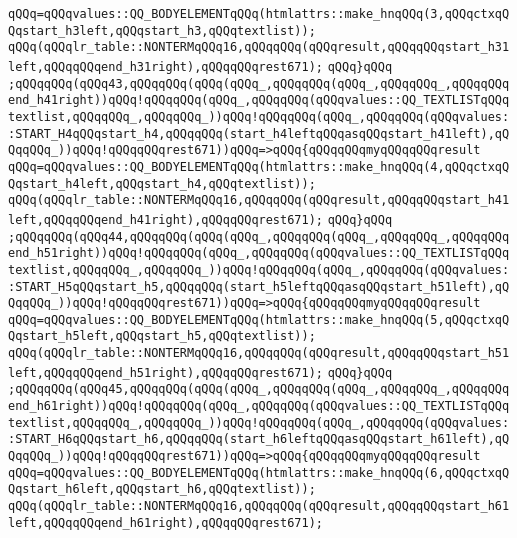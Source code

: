 \verb|qQQq=qQQqvalues::QQ_BODYELEMENTqQQq(htmlattrs::make_hnqQQq(3,qQQqctxqQQqstart_h3left,qQQqstart_h3,qQQqtextlist));|\newline
\verb|qQQq(qQQqlr_table::NONTERMqQQq16,qQQqqQQq(qQQqresult,qQQqqQQqstart_h31left,qQQqqQQqend_h31right),qQQqqQQqrest671);|\newline
\verb|qQQq}qQQq|\newline
\verb|;qQQqqQQq(qQQq43,qQQqqQQq(qQQq(qQQq_,qQQqqQQq(qQQq_,qQQqqQQq_,qQQqqQQqend_h41right))qQQq!qQQqqQQq(qQQq_,qQQqqQQq(qQQqvalues::QQ_TEXTLISTqQQqtextlist,qQQqqQQq_,qQQqqQQq_))qQQq!qQQqqQQq(qQQq_,qQQqqQQq(qQQqvalues::START_H4qQQqstart_h4,qQQqqQQq(start_h4leftqQQqasqQQqstart_h41left),qQQqqQQq_))qQQq!qQQqqQQqrest671))qQQq=>qQQq{qQQqqQQqmyqQQqqQQqresult|\newline
\verb|qQQq=qQQqvalues::QQ_BODYELEMENTqQQq(htmlattrs::make_hnqQQq(4,qQQqctxqQQqstart_h4left,qQQqstart_h4,qQQqtextlist));|\newline
\verb|qQQq(qQQqlr_table::NONTERMqQQq16,qQQqqQQq(qQQqresult,qQQqqQQqstart_h41left,qQQqqQQqend_h41right),qQQqqQQqrest671);|\newline
\verb|qQQq}qQQq|\newline
\verb|;qQQqqQQq(qQQq44,qQQqqQQq(qQQq(qQQq_,qQQqqQQq(qQQq_,qQQqqQQq_,qQQqqQQqend_h51right))qQQq!qQQqqQQq(qQQq_,qQQqqQQq(qQQqvalues::QQ_TEXTLISTqQQqtextlist,qQQqqQQq_,qQQqqQQq_))qQQq!qQQqqQQq(qQQq_,qQQqqQQq(qQQqvalues::START_H5qQQqstart_h5,qQQqqQQq(start_h5leftqQQqasqQQqstart_h51left),qQQqqQQq_))qQQq!qQQqqQQqrest671))qQQq=>qQQq{qQQqqQQqmyqQQqqQQqresult|\newline
\verb|qQQq=qQQqvalues::QQ_BODYELEMENTqQQq(htmlattrs::make_hnqQQq(5,qQQqctxqQQqstart_h5left,qQQqstart_h5,qQQqtextlist));|\newline
\verb|qQQq(qQQqlr_table::NONTERMqQQq16,qQQqqQQq(qQQqresult,qQQqqQQqstart_h51left,qQQqqQQqend_h51right),qQQqqQQqrest671);|\newline
\verb|qQQq}qQQq|\newline
\verb|;qQQqqQQq(qQQq45,qQQqqQQq(qQQq(qQQq_,qQQqqQQq(qQQq_,qQQqqQQq_,qQQqqQQqend_h61right))qQQq!qQQqqQQq(qQQq_,qQQqqQQq(qQQqvalues::QQ_TEXTLISTqQQqtextlist,qQQqqQQq_,qQQqqQQq_))qQQq!qQQqqQQq(qQQq_,qQQqqQQq(qQQqvalues::START_H6qQQqstart_h6,qQQqqQQq(start_h6leftqQQqasqQQqstart_h61left),qQQqqQQq_))qQQq!qQQqqQQqrest671))qQQq=>qQQq{qQQqqQQqmyqQQqqQQqresult|\newline
\verb|qQQq=qQQqvalues::QQ_BODYELEMENTqQQq(htmlattrs::make_hnqQQq(6,qQQqctxqQQqstart_h6left,qQQqstart_h6,qQQqtextlist));|\newline
\verb|qQQq(qQQqlr_table::NONTERMqQQq16,qQQqqQQq(qQQqresult,qQQqqQQqstart_h61left,qQQqqQQqend_h61right),qQQqqQQqrest671);|\newline
